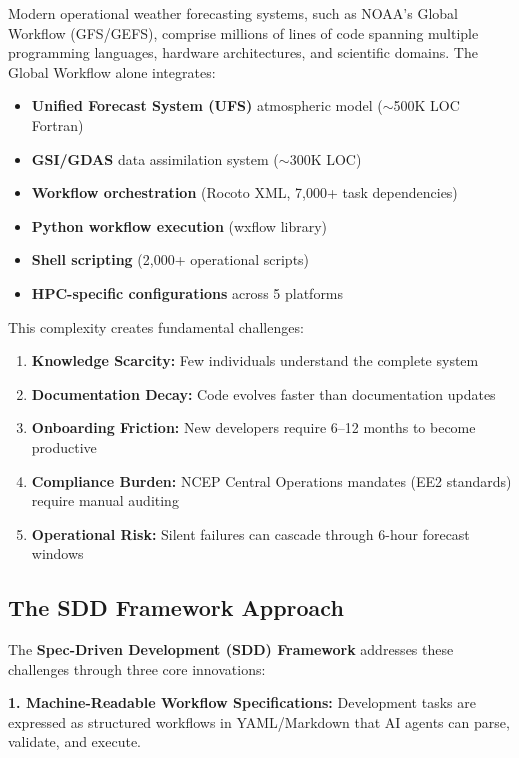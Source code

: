 \documentclass[11pt,letterpaper]{article}
\begin{document}
Modern operational weather forecasting systems, such as NOAA's Global Workflow (GFS/GEFS), comprise millions of lines of code spanning multiple programming languages, hardware architectures, and scientific domains. The Global Workflow alone integrates:

\begin{itemize}
    \item \textbf{Unified Forecast System (UFS)} atmospheric model ($\sim$500K LOC Fortran)
    \item \textbf{GSI/GDAS} data assimilation system ($\sim$300K LOC)
    \item \textbf{Workflow orchestration} (Rocoto XML, 7,000+ task dependencies)
    \item \textbf{Python workflow execution} (wxflow library)
    \item \textbf{Shell scripting} (2,000+ operational scripts)
    \item \textbf{HPC-specific configurations} across 5 platforms
\end{itemize}

This complexity creates fundamental challenges:

\begin{enumerate}
    \item \textbf{Knowledge Scarcity:} Few individuals understand the complete system
    \item \textbf{Documentation Decay:} Code evolves faster than documentation updates
    \item \textbf{Onboarding Friction:} New developers require 6--12 months to become productive
    \item \textbf{Compliance Burden:} NCEP Central Operations mandates (EE2 standards) require manual auditing
    \item \textbf{Operational Risk:} Silent failures can cascade through 6-hour forecast windows
\end{enumerate}

\subsection{The SDD Framework Approach}

The \textbf{Spec-Driven Development (SDD) Framework} addresses these challenges through three core innovations:

\textbf{1. Machine-Readable Workflow Specifications:} Development tasks are expressed as structured workflows in YAML/Markdown that AI agents can parse, validate, and execute.
\end{document}
